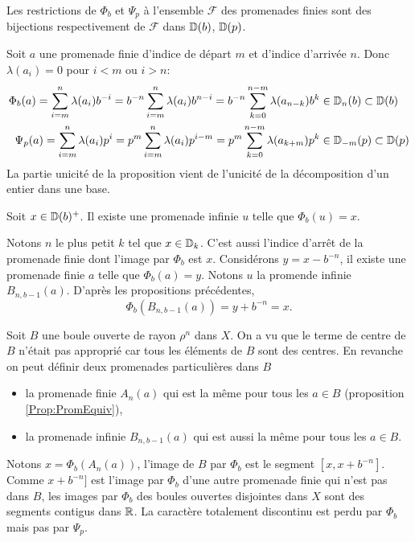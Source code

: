 \begin{prop}
 Les restrictions de $\Phi_b$ et $\Psi_p$ à l'ensemble $\mathcal{F}$ des promenades finies sont des bijections respectivement de $\mathcal{F}$ dans $\mathbb{D}(b)$, $\mathbb{D}(p)$.
\end{prop}
\begin{demo}
Soit $a$ une promenade finie d'indice de départ $m$ et d'indice d'arrivée $n$. Donc $\lambda(a_i)=0$ pour $i<m$ ou $i>n$:
\begin{align*}
 \Phi_b(a) = \sum_{i=m}^n \lambda(a_i) b^{-i} = b^{-n}\sum_{i= m}^{n} \lambda(a_{i}) b^{n - i}
 = b^{-n}\sum_{k= 0}^{n-m} \lambda(a_{n-k}) b^{k} &\in \mathbb{D}_n(b) \subset \mathbb{D}(b) \\
 \Psi_p(a) = \sum_{i=m}^n \lambda(a_i) p^{i} = p^{m}\sum_{i= m}^{n} \lambda(a_{i}) p^{i-m}
 = p^{m}\sum_{k= 0}^{n-m} \lambda(a_{k+m}) p^{k} &\in \mathbb{D}_{-m}(p) \subset \mathbb{D}(p)
\end{align*}
La partie unicité de la proposition vient de l'unicité de la décomposition d'un entier dans une base.
\end{demo}

\begin{prop}
 Soit $x\in \mathbb{D}(b)^+$. Il existe une promenade infinie $u$ telle que $\Phi_b(u)=x$.
\end{prop}
\begin{demo}
Notons $n$ le plus petit $k$ tel que $x\in \mathbb{D}_k$. C'est aussi l'indice d'arrêt de la promenade finie dont l'image par $\Phi_b$ est $x$. Considérons $y = x - b^{-n}$, il existe une promenade finie $a$ telle que $\Phi_b(a) = y$. Notons $u$ la promende infinie $B_{n,b-1}(a)$. D'après les propositions précédentes,
\begin{displaymath}
 \Phi_b(B_{n,b-1}(a)) = y + b^{-n} = x.
\end{displaymath}

\end{demo}

Soit $B$ une boule ouverte de rayon $\rho^n$ dans $X$. On a vu que le terme de centre de $B$ n'était pas approprié car tous les éléments de $B$ sont des centres. En revanche on peut définir deux promenades particulières dans $B$
\begin{itemize}
 \item la promenade finie $A_n(a)$ qui est la même pour tous les $a\in B$ (proposition \ref{Prop:PromEquiv}),
 \item la promenade infinie $B_{n,b-1}(a)$ qui est aussi la même pour tous les $a\in B$.
\end{itemize}
Notons $x = \Phi_b(A_n(a))$, l'image de $B$ par $\Phi_b$ est le segment $[x,x+b^{-n}]$. Comme $x+b^{-n}]$ est l'image par $\Phi_b$ d'une autre promenade finie qui n'est pas dans $B$, les images par $\Phi_b$ des boules ouvertes disjointes dans $X$ sont des segments contigus dans $\mathbb{R}$. La caractère totalement discontinu est perdu par $\Phi_b$ mais pas par $\Psi_p$.

